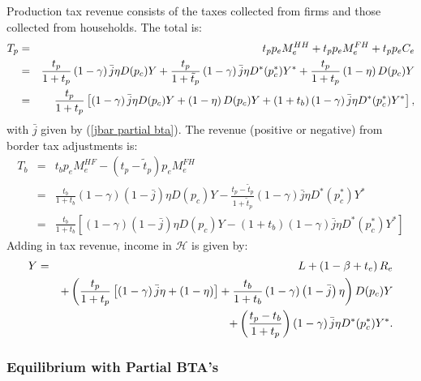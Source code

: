 \documentclass[notitlepage,12pt]{article}
\begin{document}
Production tax revenue consists of the taxes collected from firms and those
collected from households. The total is:%
\begin{eqnarray*}
T_{p} &=&t_{p}p_{e}M_{e}^{HH}+t_{p}p_{e}M_{e}^{FH}+t_{p}p_{e}C_{e} \\
&=&\frac{t_{p}}{1+t_{p}}\left( 1-\gamma \right) \bar{j}\eta D(p_{c})Y+\frac{%
t_{p}}{1+\tilde{t}_{p}}\left( 1-\gamma \right) \bar{j}\eta D^{\ast
}(p_{c}^{\ast })Y^{\ast }+\frac{t_{p}}{1+t_{p}}\left( 1-\eta \right)
D(p_{c})Y \\
&=&\frac{t_{p}}{1+t_{p}}\left[ \left( 1-\gamma \right) \bar{j}\eta
D(p_{c})Y+\left( 1-\eta \right) D(p_{c})Y+\left( 1+t_{b}\right) \left(
1-\gamma \right) \bar{j}\eta D^{\ast }(p_{c}^{\ast })Y^{\ast }\right] ,
\end{eqnarray*}%
with $\bar{j}$ given by (\ref{jbar partial bta}). The revenue (positive or
negative) from border tax adjustments is:%
\begin{eqnarray*}
T_{b} &=&t_{b}p_{e}M_{e}^{HF}-\left( t_{p}-\tilde{t}_{p}\right)
p_{e}M_{e}^{FH} \\
&=&\frac{t_{b}}{1+t_{b}}\left( 1-\gamma \right) \left( 1-\bar{j}\right) \eta
D(p_{c})Y-\frac{t_{p}-\tilde{t}_{p}}{1+\tilde{t}_{p}}\left( 1-\gamma \right) 
\bar{j}\eta D^{\ast }(p_{c}^{\ast })Y^{\ast } \\
&=&\frac{t_{b}}{1+t_{b}}\left[ \left( 1-\gamma \right) \left( 1-\bar{j}%
\right) \eta D(p_{c})Y-\left( 1+t_{b}\right) \left( 1-\gamma \right) \bar{j}%
\eta D^{\ast }(p_{c}^{\ast })Y^{\ast }\right] 
\end{eqnarray*}%
Adding in tax revenue, income in $\mathcal{H}$ is given by:%
\begin{eqnarray}
Y &=&L+\left( 1-\beta +t_{e}\right) R_{e}  \notag \\
&&+\left( \frac{t_{p}}{1+t_{p}}\left[ \left( 1-\gamma \right) \bar{j}\eta
+\left( 1-\eta \right) \right] +\frac{t_{b}}{1+t_{b}}\left( 1-\gamma \right)
\left( 1-\bar{j}\right) \eta \right) D(p_{c})Y  \notag \\
&&+\left( \frac{t_{p}-t_{b}}{1+t_{p}}\right) \left( 1-\gamma \right) \bar{j}%
\eta D^{\ast }(p_{c}^{\ast })Y^{\ast }.  \label{Y home partial bta}
\end{eqnarray}

\subsubsection{Equilibrium with Partial BTA's}
\end{document}

